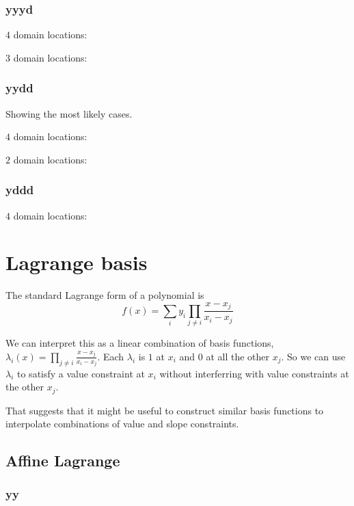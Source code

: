 

\subsubsection{yyyd}

$4$ domain locations:


$3$ domain locations:


\subsubsection{yydd}

Showing the most likely cases.

$4$ domain locations:


$2$ domain locations:


\subsubsection{yddd}
$4$ domain locations:



\restoregeometry
  
\section{Lagrange basis}

The standard Lagrange\cite{wiki:Lagrange-polynomial}
form of a polynomial  is
\begin{equation}
f(x) = \sum_{i} y_i \prod_{j \neq i} \frac{x - x_j}{x_i -x_j}
\end{equation}

We can interpret this as a linear combination of basis functions,
$\lambda_i (x) = \prod_{j \neq i} \frac{x - x_j}{x_i -x_j}$.
Each $\lambda_i$ is $1$ at $x_i$ and $0$ at all the other $x_j$.
So we can use $\lambda_i$ to satisfy a value constraint at $x_i$
without interferring with value constraints at the other $x_j$.

That suggests that it might be useful to construct similar basis
functions to interpolate combinations of value and slope 
constraints.


\subsection{Affine Lagrange}

\subsubsection{yy}

